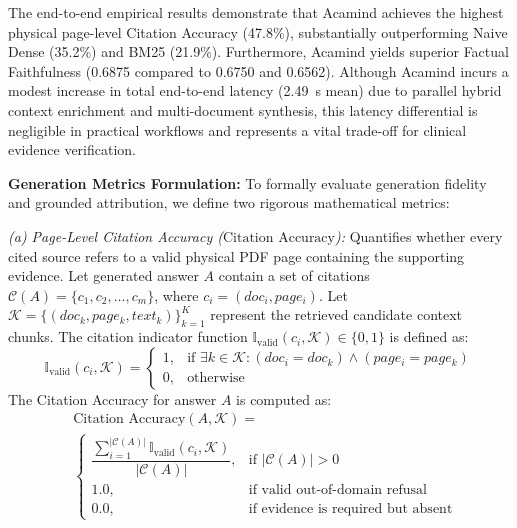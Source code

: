 \documentclass[10pt]{SPIIRAS_Proceedings}
\begin{document}
The end-to-end empirical results demonstrate that Acamind achieves the highest physical page-level Citation Accuracy (47.8\%), substantially outperforming Naive Dense (35.2\%) and BM25 (21.9\%). Furthermore, Acamind yields superior Factual Faithfulness (0.6875 compared to 0.6750 and 0.6562). Although Acamind incurs a modest increase in total end-to-end latency (2.49~s mean) due to parallel hybrid context enrichment and multi-document synthesis, this latency differential is negligible in practical workflows and represents a vital trade-off for clinical evidence verification.

\textbf{Generation Metrics Formulation:} To formally evaluate generation fidelity and grounded attribution, we define two rigorous mathematical metrics:

\textit{(a) Page-Level Citation Accuracy ($\text{Citation Accuracy}$):} Quantifies whether every cited source refers to a valid physical PDF page containing the supporting evidence. Let generated answer $A$ contain a set of citations $\mathcal{C}(A) = \{c_1, c_2, \dots, c_m\}$, where $c_i = (doc_i, page_i)$. Let $\mathcal{K} = \{(doc_k, page_k, text_k)\}_{k=1}^K$ represent the retrieved candidate context chunks. The citation indicator function $\mathbb{I}_{\text{valid}}(c_i, \mathcal{K}) \in \{0, 1\}$ is defined as:
\begin{equation}
\mathbb{I}_{\text{valid}}(c_i, \mathcal{K}) = 
\begin{cases} 
1, & \text{if } \exists k \in \mathcal{K}: (doc_i = doc_k) \land (page_i = page_k) \\
0, & \text{otherwise}
\end{cases}
\label{eq:ivalid}
\end{equation}
The Citation Accuracy for answer $A$ is computed as:
\begin{equation}
\begin{aligned}
&\text{Citation Accuracy}(A,\mathcal{K}) =\\
&\begin{cases}
\dfrac{
\sum_{i=1}^{|\mathcal{C}(A)|}
\mathbb{I}_{\mathrm{valid}}(c_i,\mathcal{K})
}{
|\mathcal{C}(A)|
},
& \text{if }|\mathcal{C}(A)|>0
\\[8pt]
1.0,
& \text{if valid out-of-domain refusal}
\\[6pt]
0.0,
& \text{if evidence is required but absent}
\end{cases}
\end{aligned}
\label{eq:cite_acc}
\end{equation}
\end{document}
